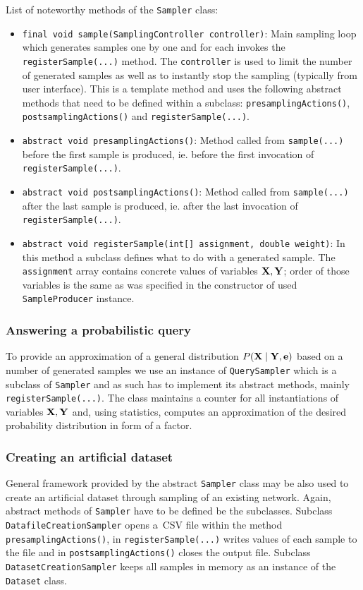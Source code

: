 \documentclass[english,cover]{fitthesis} %
\newcommand{\srccode}[1]{{\tt #1}}         %
\newcommand{\vars}[1]{{\bold{#1}}}         %
\begin{document}
\medskip
List of noteworthy methods of the \srccode{Sampler} class:
\begin{itemize}
	\item \srccode{final void sample(SamplingController controller)}: Main sampling loop which generates samples one by one and for each invokes the \srccode{registerSample(...)} method. The \srccode{controller} is used to limit the number of generated samples as well as to instantly stop the sampling (typically from user interface). This is a template method and uses the following abstract methods that need to be defined within a subclass: \srccode{presamplingActions()}, \srccode{postsamplingActions()} and \srccode{registerSample(...)}.
	\item \srccode{abstract void presamplingActions()}: Method called from \srccode{sample(...)} before the first sample is produced, ie. before the first invocation of \srccode{registerSample(...)}.
	\item \srccode{abstract void postsamplingActions()}: Method called from \srccode{sample(...)} after the last sample is produced, ie. after the last invocation of \srccode{registerSample(...)}.
	\item \srccode{abstract void registerSample(int[] assignment, double weight)}: In this me\-thod a subclass defines what to do with a generated sample. The \srccode{assignment} array contains concrete values of variables $\vars{X},\vars{Y}$; order of those variables is the same as was specified in the constructor of used \srccode{SampleProducer} instance.
\end{itemize}


\subsubsection{Answering a probabilistic query}
To provide an approximation of a general distribution $P(\vars{X} \mid \vars{Y}, \vars{e})$ based on a number of generated samples we use an instance of \srccode{QuerySampler} which is a subclass of \srccode{Sampler} and as such has to implement its abstract methods, mainly \srccode{registerSample(...)}. The class maintains a counter for all instantiations of variables $\vars{X},\vars{Y}$ and, using statistics, computes an approximation of the desired probability distribution in form of a factor.


\subsubsection{Creating an artificial dataset}
General framework provided by the abstract \srccode{Sampler} class may be also used to create an artificial dataset through sampling of an existing network. Again, abstract methods of \srccode{Sampler} have to be defined be the subclasses. Subclass \srccode{DatafileCreationSampler} opens a~CSV file within the method \srccode{presamplingActions()}, in \srccode{registerSample(...)} writes values of each sample to the file and in \srccode{postsamplingActions()} closes the output file. Subclass \srccode{DatasetCreationSampler} keeps all samples in memory as an instance of the \srccode{Dataset} class.
\end{document}
